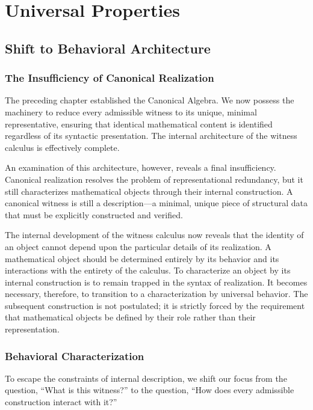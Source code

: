 \documentclass[12pt,anyside]{book}
\begin{document}

\chapter{Universal Properties}
\setlength{\parindent}{0pt}

\section{Shift to Behavioral Architecture}

\subsection{The Insufficiency of Canonical Realization}
The preceding chapter established the Canonical Algebra. We now possess the machinery to reduce every admissible witness to its unique, minimal representative, ensuring that identical mathematical content is identified regardless of its syntactic presentation. The internal architecture of the witness calculus is effectively complete.

An examination of this architecture, however, reveals a final insufficiency. Canonical realization resolves the problem of representational redundancy, but it still characterizes mathematical objects through their internal construction. A canonical witness is still a description—a minimal, unique piece of structural data that must be explicitly constructed and verified. 

The internal development of the witness calculus now reveals that the identity of an object cannot depend upon the particular details of its realization. A mathematical object should be determined entirely by its behavior and its interactions with the entirety of the calculus. To characterize an object by its internal construction is to remain trapped in the syntax of realization. It becomes necessary, therefore, to transition to a characterization by universal behavior. The subsequent construction is not postulated; it is strictly forced by the requirement that mathematical objects be defined by their role rather than their representation.

\subsection{Behavioral Characterization}
To escape the constraints of internal description, we shift our focus from the question, ``What is this witness?'' to the question, ``How does every admissible construction interact with it?''
\end{document}
